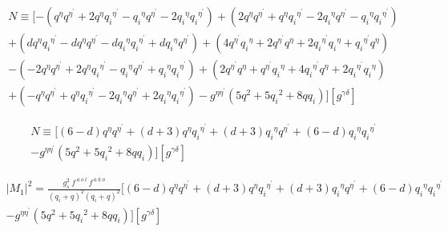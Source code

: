 \begin{equation}
\begin{split}
N\equiv [-({q}^{{\eta}}{q}^{{\eta}^{\prime}}+2{q}^{{\eta}}{q_i}^{{\eta}^{\prime}}-{q_i}^{{\eta}}{q}^{{\eta}^{\prime}}-2{q_i}^{{\eta}}{q_i}^{{\eta}^{\prime}})
+(2{q}^{{\eta}}{q}^{{\eta}^{\prime}}+{q}^{{\eta}}{q_i}^{{\eta}^{\prime}}-2{q_i}^{{\eta}}{q}^{{\eta}^{\prime}}-{q_i}^{{\eta}}{q_i}^{{\eta}^{\prime}})\\+(d{q}^{{\eta}}{q_i}^{{\eta}^{\prime}}-d{q}^{{\eta}}{q}^{{\eta}^{\prime}}-d{q_i}^{{\eta}}{q_i}^{{\eta}^{\prime}}+d{q_i}^{{\eta}}{q}^{{\eta}^{\prime}})+(4{q}^{{\eta}^{\prime}}{q_i}^{{\eta}}+2{q}^{{\eta}^{\prime}}{q}^{{\eta}}+2{q_i}^{{\eta}^{\prime}}{q_i}^{{\eta}}+{q_i}^{{\eta}^{\prime}}{q}^{{\eta}})\\
-(-2{q}^{{\eta}}{q}^{{\eta}^{\prime}}+2{q}^{{\eta}}{q_i}^{{\eta}^{\prime}}-{q_i}^{{\eta}}{q}^{{\eta}^{\prime}}+{q_i}^{{\eta}}{q_i}^{{\eta}^{\prime}})+(2{q}^{{\eta}^{\prime}}{q}^{{\eta}}+{q}^{{\eta}^{\prime}}{q_i}^{{\eta}}+4{q_i}^{{\eta}^{\prime}}{q}^{{\eta}}+2{q_i}^{{\eta}^{\prime}}{q_i}^{{\eta}})\\+(-{q}^{{\eta}}{q}^{{\eta}^{\prime}}+{q}^{{\eta}}{q_i}^{{\eta}^{\prime}}-2{q_i}^{{\eta}}{q}^{{\eta}^{\prime}}+2{q_i}^{{\eta}}{q_i}^{{\eta}^{\prime}})
-g^{{\eta}{{\eta}^{\prime}}}(5{q}^2+5{q_i}^2+8qq_i)][g^{{\gamma}{\delta}}]
\end{split}
\end{equation}

\begin{equation}
\begin{split}
N\equiv [(6-d){q}^{{\eta}}{q}^{{\eta}^{\prime}}+(d+3){q}^{{\eta}}{q_i}^{{\eta}^{\prime}}+(d+3){q_i}^{{\eta}}{q}^{{\eta}^{\prime}}+(6-d){q_i}^{{\eta}}{q_i}^{{\eta}^{\prime}}\\
-g^{{\eta}{{\eta}^{\prime}}}(5{q}^2+5{q_i}^2+8qq_i)][g^{{\gamma}{\delta}}]
\end{split}
\end{equation}

\begin{equation}
\begin{split}
|M_1|^2=\frac{g_s^2 \:f^{\:a\:o\:l}\: f^{\:a\:k\:o}}{(q_i +q)^2 (q_i +q)^2} [(6-d){q}^{{\eta}}{q}^{{\eta}^{\prime}}+(d+3){q}^{{\eta}}{q_i}^{{\eta}^{\prime}}+(d+3){q_i}^{{\eta}}{q}^{{\eta}^{\prime}}+(6-d){q_i}^{{\eta}}{q_i}^{{\eta}^{\prime}}\\
-g^{{\eta}{{\eta}^{\prime}}}(5{q}^2+5{q_i}^2+8qq_i)][g^{{\gamma}{\delta}}]
\end{split}
\end{equation}


